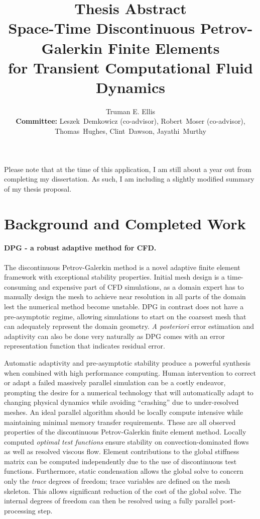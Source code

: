 \documentclass[letterpaper]{article}
\title{Thesis Abstract \\ \vspace{2 mm} {\large Space-Time Discontinuous Petrov-Galerkin Finite Elements \\for Transient Computational Fluid Dynamics}}
\author{Truman E. Ellis\\
\small \textbf{Committee:} Leszek~Demkowicz (co-advisor), Robert~Moser (co-advisor), \\Thomas~Hughes, Clint~Dawson, Jayathi~Murthy}
\date{}
\begin{document}
\maketitle
Please note that at the time of this application, I am still about a year out from completing my dissertation. As such, I am including a slightly modified summary of my thesis proposal.

\section{Background and Completed Work}
\paragraph{DPG - a robust adaptive method for CFD.}
The discontinuous Petrov-Galerkin method\cite{DPGOverview} is a novel adaptive finite element framework with exceptional stability properties.
Initial mesh design is a time-consuming and expensive part of CFD simulations, as a domain expert has to manually design the 
mesh to achieve near resolution in all parts of the domain lest the numerical method become unstable.
DPG in contrast does not have a pre-asymptotic regime, allowing simulations to start on the coarsest mesh that can adequately represent the domain geometry.
\emph{A posteriori} error estimation and adaptivity can also be done very naturally as DPG comes with an error representation function 
that indicates residual error.

Automatic adaptivity and pre-asymptotic stability produce a powerful synthesis when combined with high performance computing.
Human intervention to correct or adapt a failed massively parallel simulation can be a costly endeavor, prompting the desire for a
numerical technology that will automatically adapt to changing physical dynamics while avoiding ``crashing'' due to under-resolved meshes.
An ideal parallel algorithm should be locally compute intensive while maintaining minimal memory transfer requirements\cite{BlastWebPage}.
These are all observed properties of the discontinuous Petrov-Galerkin finite element method.
Locally computed \emph{optimal test functions} ensure stability on convection-dominated flows as well as resolved viscous flow.
Element contributions to the global stiffness matrix can be computed independently due to the use of discontinuous test functions.
Furthermore, static condensation allows the global solve to concern only the \emph{trace} degrees of freedom; 
trace variables are defined on the mesh skeleton.  
This allows significant reduction of the cost of the global solve.  
The internal degrees of freedom can then be resolved using a fully parallel post-processing step.
\end{document}
